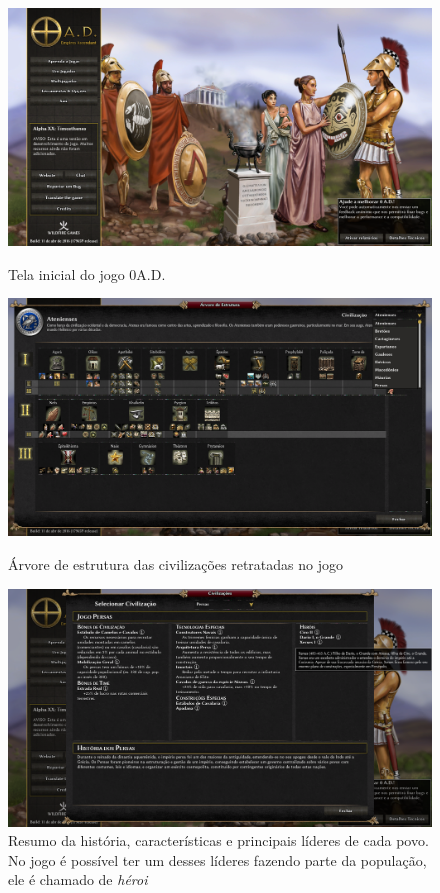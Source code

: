 \documentclass[article,11pt, a4paper,sumario=tradicional]{abntex2}
\begin{document}
	\begin{figure}
		\centering
		\includegraphics[width=0.9\linewidth]{screenshots_0ad/screenshot0006}
		\caption[]{Tela inicial do jogo 0A.D.}
		\label{fig:screenshot0006}
		
		\includegraphics[width=0.9\linewidth]{screenshots_0ad/screenshot0007}
		\caption{Árvore de estrutura das civilizações retratadas no jogo}
		\label{fig:screenshot0007}
		
		\includegraphics[width=0.9\linewidth]{screenshots_0ad/screenshot0008}
		\caption[]{Resumo da história, características e principais líderes de cada povo. No jogo é possível ter um desses líderes fazendo parte da população, ele é chamado de \textit{héroi}}
		\label{fig:screenshot0008}

	\end{figure}
	
\end{document}
